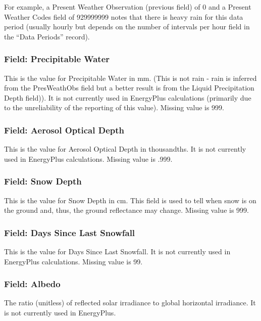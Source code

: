 For example, a Present Weather Observation (previous field) of 0 and a Present Weather Codes field of 929999999 notes that there is heavy rain for this data period (usually hourly but depends on the number of intervals per hour field in the ``Data Periods'' record).

\subsubsection{Field: Precipitable Water}\label{field-precipitable-water}

This is the value for Precipitable Water in mm. (This is not rain - rain is inferred from the PresWeathObs field but a better result is from the Liquid Precipitation Depth field)). It is not currently used in EnergyPlus calculations (primarily due to the unreliability of the reporting of this value). Missing value is 999.

\subsubsection{Field: Aerosol Optical Depth}\label{field-aerosol-optical-depth}

This is the value for Aerosol Optical Depth in thousandths. It is not currently used in EnergyPlus calculations. Missing value is .999.

\subsubsection{Field: Snow Depth}\label{field-snow-depth}

This is the value for Snow Depth in cm. This field is used to tell when snow is on the ground and, thus, the ground reflectance may change. Missing value is 999.

\subsubsection{Field: Days Since Last Snowfall}\label{field-days-since-last-snowfall}

This is the value for Days Since Last Snowfall. It is not currently used in EnergyPlus calculations. Missing value is 99.

\subsubsection{Field: Albedo}\label{field-albedo}

The ratio (unitless) of reflected solar irradiance to global horizontal irradiance. It is not currently used in EnergyPlus.

